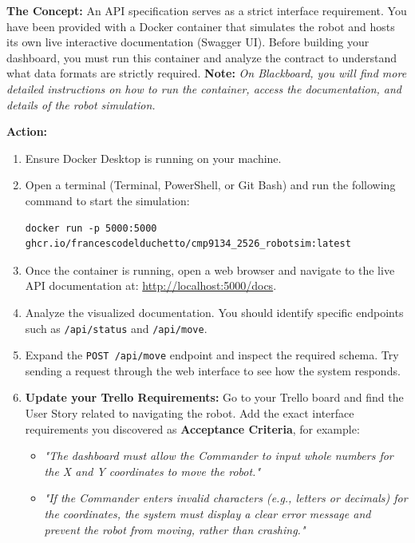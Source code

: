 \documentclass[a4paper,12pt]{article}
\begin{document}
\textbf{The Concept:} An API specification serves as a strict interface requirement. You have been provided with a Docker container that simulates the robot and hosts its own live interactive documentation (Swagger UI). Before building your dashboard, you must run this container and analyze the contract to understand what data formats are strictly required. \textbf{Note:} \textit{On Blackboard, you will find more detailed instructions on how to run the container, access the documentation, and details of the robot simulation.} 

\vspace{0.3cm}
\textbf{Action:}
\begin{enumerate}
    \item Ensure Docker Desktop is running on your machine.
    \item Open a terminal (Terminal, PowerShell, or Git Bash) and run the following command to start the simulation:
    \begin{verbatim}
docker run -p 5000:5000 ghcr.io/francescodelduchetto/cmp9134_2526_robotsim:latest
    \end{verbatim}
    \item Once the container is running, open a web browser and navigate to the live API documentation at: \href{http://localhost:5000/docs}{http://localhost:5000/docs}.
    \item Analyze the visualized documentation. You should identify specific endpoints such as \texttt{/api/status} and \texttt{/api/move}.
    \item Expand the \texttt{POST /api/move} endpoint and inspect the required schema. Try sending a request through the web interface to see how the system responds.
    \item \textbf{Update your Trello Requirements:} Go to your Trello board and find the User Story related to navigating the robot. Add the exact interface requirements you discovered as \textbf{Acceptance Criteria}, for example:
\begin{itemize}
        \item \textit{"The dashboard must allow the Commander to input whole numbers for the X and Y coordinates to move the robot."}
        \item \textit{"If the Commander enters invalid characters (e.g., letters or decimals) for the coordinates, the system must display a clear error message and prevent the robot from moving, rather than crashing."}
    \end{itemize}

\end{enumerate}
\end{document}
